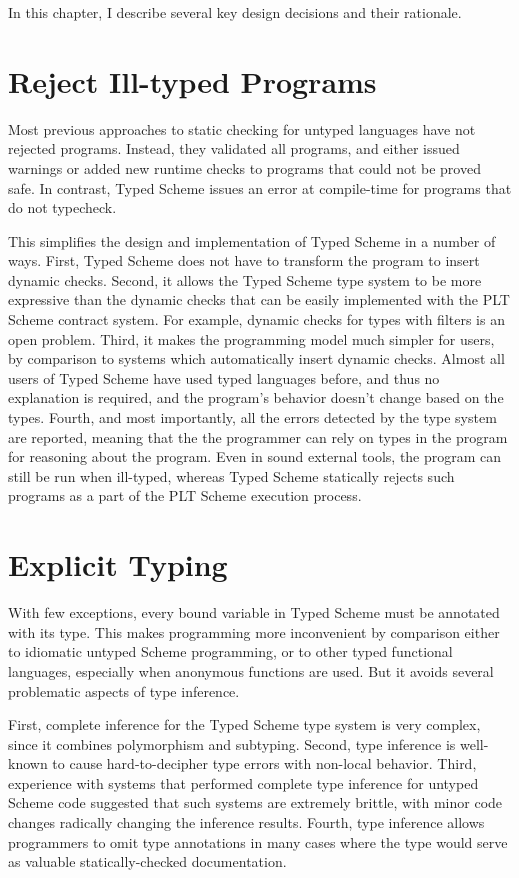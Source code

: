 \begin{schemeregion}
In this chapter, I describe several key design decisions and their
rationale. 

\section{Reject Ill-typed Programs}

Most previous approaches to static checking for untyped languages have
not rejected programs.  Instead, they validated all programs, and
either issued warnings or added new runtime checks to programs that
could not be proved safe.  In contrast, Typed
Scheme issues an error at compile-time for programs that do not
typecheck.  

This simplifies the design and implementation of Typed Scheme in a
number of ways.  First, Typed Scheme does not have to transform the
program to insert dynamic checks.  Second, it allows the Typed Scheme
type system to be more expressive than the dynamic checks that can be
easily implemented with the PLT Scheme contract system.
  For example, dynamic checks for types with filters
is an open problem.  Third, it makes the programming model much
simpler for users, by comparison to systems which automatically insert
dynamic checks.  Almost all users of Typed Scheme have used typed
languages before, and thus no explanation is required, and the
program's behavior
doesn't change based on the types. Fourth, and most importantly, all
the errors detected by the type system are reported, meaning that the
the programmer can rely on types in the program  for
reasoning about the program.  Even in sound external tools, the
program can still be run when ill-typed, whereas Typed Scheme
statically rejects such programs as a part of the PLT Scheme execution
process. 

\section{Explicit Typing}

With few exceptions, every bound variable in Typed Scheme must be
annotated with its type.  This makes programming more inconvenient by
comparison either to idiomatic untyped Scheme programming, or to other
typed functional languages, especially when anonymous functions are
used.  But it avoids several problematic aspects of type inference.

First, complete inference for the Typed Scheme type system is very
complex, since it combines polymorphism and subtyping.  Second,
type inference is well-known to cause hard-to-decipher type errors
with non-local behavior.  Third, experience with systems that
performed complete type inference for untyped Scheme code suggested
that such systems are extremely brittle, with minor code changes
radically changing the inference results.  Fourth, type inference
allows programmers to omit type annotations in many cases where the
type would serve as valuable statically-checked documentation.


\end{schemeregion}
